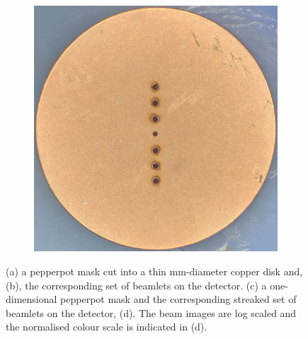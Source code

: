 \begin{figure}
    \begin{subfigure}{0.49\linewidth}
    \centering
    \includegraphics[width=\linewidth]{part2/Figs/example_pepperpot_1d.jpg}
    \caption{}
    \label{figure:1d_pepperpot}
    \end{subfigure}
    \begin{subfigure}{0.49\linewidth}
    \centering
    
    \caption{}
    \label{figure:streaked_1d_pepperpot}
    \end{subfigure}
    \caption[One- and two-dimensional pepperpot masks.]{(a) a pepperpot mask cut into a thin \unit[3]{mm}-diameter copper disk and, (b), the corresponding set of beamlets on the detector. (c) a one-dimensional pepperpot mask and the corresponding streaked set of beamlets on the detector, (d). The beam images are log scaled and the normalised colour scale is indicated in (d).}
    \label{figure:pepperpot_example}
\end{figure}

